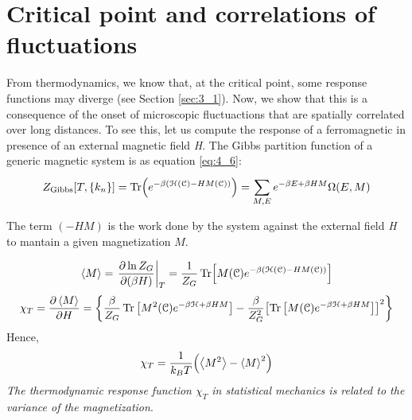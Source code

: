 \documentclass[../main/main.tex]{subfiles}
\begin{document}
 \section{Critical point and correlations of fluctuations}
 From thermodynamics, we know that, at the critical point, some response functions may diverge (see Section \ref{sec:3_1}). Now, we show that this is a consequence of the onset of microscopic fluctuactions that are spatially correlated over long distances.
 To see this, let us compute the response of a ferromagnetic in presence of an external magnetic field \emph{H}.
 The Gibbs partition function of a generic magnetic system is as equation \eqref{eq:4_6}:
 \begin{equation*}
   Z_{\text{Gibbs}} [T,\{ k_n \}  ] = \Tr(e^{-\beta (\mathcal{H} (\mathcal{C}) - H M (\mathcal{C}))} ) = \sum_{M,E}^{} e^{-\beta E + \beta H M} \Omega (E,M)
 \end{equation*}
\begin{remark}
The term \( (- H M) \) is the work done by the system against the external field \emph{H} to mantain a given magnetization \( M \).
\end{remark}
\begin{equation}
  \expval{M} = \eval{ \pdv{\ln{Z_G} }{(\beta H)} }_T = \frac{1}{Z_G} \Tr[M (\mathcal{C}) e^{-\beta ( \mathcal{H} (\mathcal{C}) - H M (\mathcal{C}))} ]
\end{equation}
\begin{equation}
  \chi _T = \pdv{\expval{M} }{H} = \qty{\frac{\beta }{Z_G} \Tr \qty[M^2 (\mathcal{C}) e^{-\beta \mathcal{H} + \beta H M} ] - \frac{\beta }{Z_G^2} \qty[ \Tr \qty[M (\mathcal{C}) e^{-\beta \mathcal{H} + \beta H M } ]  ]^2 }
\end{equation}
Hence,
\begin{equation}
  \chi _T = \frac{1}{k_B T} \qty(\expval{M^2} - \expval{M}^2  )
\end{equation}
\emph{The thermodynamic response function \( \chi _T \) in statistical mechanics is related to the variance of the magnetization}.
\end{document}
